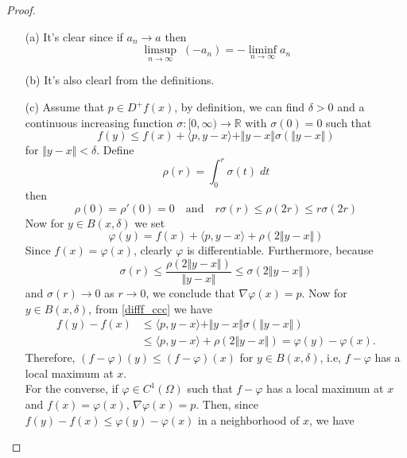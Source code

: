 \documentclass[12pt, oneside]{amsart}  	%
\begin{document}
\begin{proof}\quad
\begin{itemize}
\item[(a)] It's clear since if $a_n \longrightarrow a$ then
\begin{equation*}
\limsup_{n\longrightarrow \infty}\;(-a_n) = -\liminf_{n\longrightarrow \infty} a_n
\end{equation*}
\item[(b)] It's also clearl from the definitions.
\item[(c)] Assume that $p\in D^+f(x)$, by definition, we can find $\delta > 0$ and a continuous increasing function $\sigma:[0,\infty)\longrightarrow \mathbb{R}$ with $\sigma(0) = 0$ such that
\begin{equation}\label{difff_ccc}
f(y) \leq f(x) + \langle p,y-x\rangle + \Vert y-x\Vert \sigma(\Vert y-x\Vert)
\end{equation}
for $\Vert y-x\Vert < \delta$. Define
\begin{equation*}
\rho(r) = \int_{0}^r \sigma(t)\;dt 
\end{equation*}
then
\begin{equation*}
 \rho(0) = \rho'(0) = 0 \quad\text{and}\quad r\sigma(r)\leq \rho(2r)\leq r\sigma(2r)
\end{equation*}
Now for $y\in B(x,\delta)$ we set
\begin{equation*}
\varphi(y) = f(x) + \langle p,y-x\rangle + \rho(2\Vert y-x\Vert)
\end{equation*}
Since $f(x) = \varphi(x)$, clearly $\varphi$ is differentiable. Furthermore, because 
\begin{equation*}
\sigma(r)\leq\frac{\rho(2\Vert y-x\Vert)}{\Vert y-x\Vert}  \leq \sigma(2\Vert y-x\Vert)
\end{equation*}
and $\sigma(r)\longrightarrow 0$ as $r\longrightarrow 0$, we conclude that $\nabla \varphi(x) = p$. Now for $y\in B(x,\delta)$, from \eqref{difff_ccc} we have
\begin{align*}
f(y) - f(x) &\leq \langle p,y-x\rangle + \Vert y-x\Vert\sigma(\Vert y-x\Vert)\\
 &\leq \langle p,y-x\rangle + \rho(2\Vert y-x\Vert) = \varphi(y) - \varphi(x).
\end{align*}
Therefore, $(f-\varphi)(y) \leq (f-\varphi)(x)$ for $y\in B(x,\delta)$, i.e, $f-\varphi$ has a local maximum at $x$.\\
For the converse, if $\varphi\in C^1(\Omega)$ such that $f-\varphi$ has a local maximum at $x$ and $f(x) = \varphi(x)$, $\nabla \varphi(x) = p$. Then, since $f(y) -f(x) \leq \varphi(y) - \varphi(x)$ in a neighborhood of $x$, we have

\end{itemize}
\end{proof}
\end{document}

